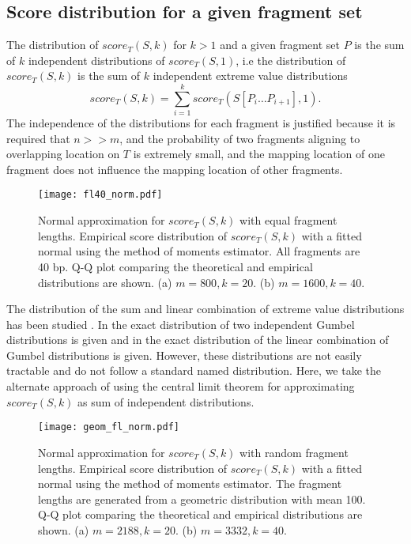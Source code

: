 \subsection{Score distribution for a given fragment set}
The distribution of $score_T(S,k)$ for $k > 1$ and a given fragment set
$P$ is the sum of $k$ independent distributions of $score_T(S,1)$, i.e
the distribution of $score_T(S,k)$ is the sum of $k$ independent extreme
value distributions \[score_T(S,k) = \sum_{i=1}^{k} score_T(S[P_i \dots
P_{i+1}], 1).\]
The independence of the distributions for each fragment is justified
because it is required that $n >> m$, and the probability of two
fragments aligning to overlapping location on $T$ is extremely small,
and the mapping location of one fragment does not influence the mapping
location of other fragments.

\begin{figure}[t!]
\centering
\texttt{[image: fl40\_norm.pdf]}
\caption[Normal approximation for $score_T(S,k)$ with equal fragment
  lengths]{
  Normal approximation for $score_T(S,k)$ with equal fragment lengths.
  Empirical score distribution of $score_T(S,k)$ with a fitted
  normal using the method of moments estimator. All fragments are 40 bp.
  Q-Q plot comparing the theoretical and empirical distributions are shown.
  (a) $m=800, k=20$.
  (b) $m=1600, k=40$.}
\label{norm_const}
\end{figure}

The distribution of the sum and linear combination of extreme value
distributions has been studied \citep{cetinkaya2001scalable,
marques2015distribution,loaiciga1999analysis,nadarajah2008exact}.  In
\cite{loaiciga1999analysis} the exact distribution of two independent
Gumbel distributions is given and in \cite{nadarajah2008exact} the exact
distribution of the linear combination of Gumbel distributions is given.
%
However, these distributions are not easily tractable and do not follow
a standard named distribution. Here, we take the alternate approach of
using the central limit theorem for approximating $score_T(S,k)$ as sum
of independent distributions.

\begin{figure}[t!]
\centering
\texttt{[image: geom\_fl\_norm.pdf]}
\caption[Normal approximation for $score_T(S,k)$ with random fragment
  lengths]{
  Normal approximation for $score_T(S,k)$ with random fragment lengths.
  Empirical score distribution of $score_T(S,k)$ with a fitted
  normal using the method of moments estimator. The fragment lengths are
  generated from a geometric distribution with mean 100. Q-Q plot comparing
  the theoretical and empirical distributions are shown.
  (a) $m=2188, k=20$.
  (b) $m=3332, k=40$.}
\label{norm_geom}
\end{figure}

